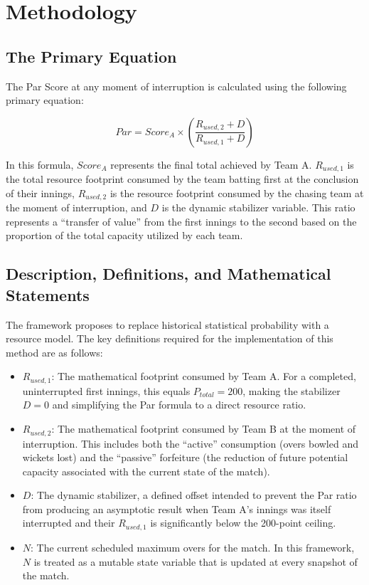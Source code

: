 \documentclass[12pt, letterpaper, fleqn]{article}
\begin{document}
\section{Methodology}

\subsection{The Primary Equation}

\indent The Par Score at any moment of interruption is calculated using the following primary equation:

\begin{equation}
Par = Score_A \times \left( \frac{R_{used,2} + D}{R_{used,1} + D} \right)
\end{equation}

\indent In this formula, $Score_A$ represents the final total achieved by Team A. $R_{used,1}$ is the total resource footprint consumed by the team batting first at the conclusion of their innings, $R_{used,2}$ is the resource footprint consumed by the chasing team at the moment of interruption, and $D$ is the dynamic stabilizer variable. This ratio represents a ``transfer of value'' from the first innings to the second based on the proportion of the total capacity utilized by each team.

\subsection{Description, Definitions, and Mathematical Statements}

\indent The framework proposes to replace historical statistical probability with a resource model. The key definitions required for the implementation of this method are as follows:

\begin{itemize}
\item \textbf{$R_{used,1}$}: The mathematical footprint consumed by Team A. For a completed, uninterrupted first innings, this equals $P_{total} = 200$, making the stabilizer $D = 0$ and simplifying the Par formula to a direct resource ratio.
\item \textbf{$R_{used,2}$}: The mathematical footprint consumed by Team B at the moment of interruption. This includes both the ``active'' consumption (overs bowled and wickets lost) and the ``passive'' forfeiture (the reduction of future potential capacity associated with the current state of the match).
\item \textbf{$D$}: The dynamic stabilizer, a defined offset intended to prevent the Par ratio from producing an asymptotic result when Team A's innings was itself interrupted and their $R_{used,1}$ is significantly below the 200-point ceiling.
\item \textbf{$N$}: The current scheduled maximum overs for the match. In this framework, $N$ is treated as a mutable state variable that is updated at every snapshot of the match.
\end{itemize}
\end{document}
